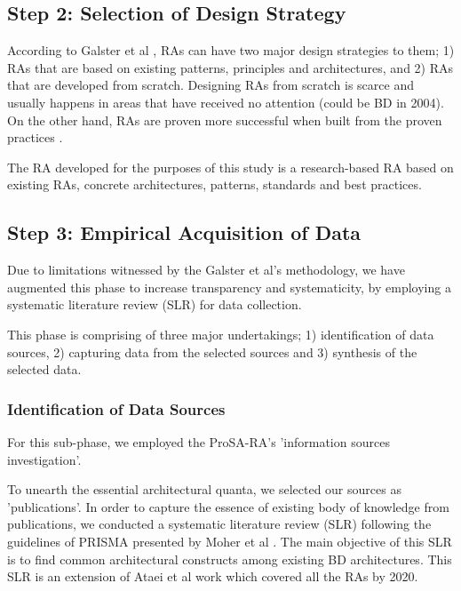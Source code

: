 \documentclass[runningheads]{llncs}
\begin{document}
\subsection{Step 2: Selection of Design Strategy}
According to Galster et al \cite{GALSTER}, RAs can have two major design strategies to them; 1) RAs that are based on existing patterns, principles and architectures, and 2) RAs that are developed from scratch. Designing RAs from scratch is scarce and usually happens in areas that have received no attention (could be BD in 2004). On the other hand, RAs are proven more successful when built from the proven practices \cite{Cloutier}. 

The RA developed for the purposes of this study is a research-based RA based on existing RAs, concrete architectures, patterns, standards and best practices.

\subsection{Step 3: Empirical Acquisition of Data}
Due to limitations witnessed by the Galster et al's methodology, we have augmented this phase to increase transparency and systematicity, by employing a systematic literature review (SLR) for data collection. 

This phase is comprising of three major undertakings; 1) identification of data sources, 2) capturing data from the selected sources and 3) synthesis of the selected data. 

\subsubsection{Identification of Data Sources\\}

For this sub-phase, we employed the ProSA-RA's 'information sources investigation'. 


To unearth the essential architectural quanta, we selected our sources as 'publications'. In order to capture the essence of existing body of knowledge from publications, we conducted a systematic literature review (SLR) following the guidelines of PRISMA presented by Moher et al \cite{Shamseer}. The main objective of this SLR is to find common architectural constructs among existing BD architectures. This SLR is an extension of Ataei et al work \cite{AtaeiACIS} which covered all the RAs by 2020. 
\end{document}
